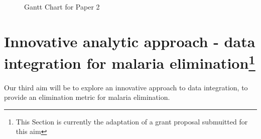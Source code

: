 \documentclass[a4paper,11pt,draft,twoside]{article}
\begin{document}
\begin{figure}[h]
\begin{ganttchart}{1}{24}
 \\
 \\
 \\
 \\
 \\
 \\
 \\
 \\
 \\
\end{ganttchart}
\caption{Gantt Chart for Paper 2}
\label{Gantt2}
\end{figure}


\newpage
\section[Innovative analytic approach - data integration for malaria elimination]{Innovative analytic approach - data integration for malaria elimination\footnote{This Section is currently the adaptation of a grant proposal submuitted for this aim}}

Our third aim will be to explore an innovative approach to data integration, to provide an elimination metric for malaria elimination.
\end{document}
